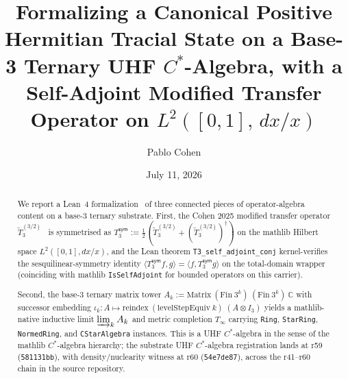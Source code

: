 \documentclass[11pt,a4paper]{amsart}
\title[Formalizing a UHF Tracial State on a Base-3 Ternary $C^*$-Algebra]{Formalizing a Canonical Positive Hermitian Tracial State on a Base-3 Ternary UHF $C^*$-Algebra, with a Self-Adjoint Modified Transfer Operator on $L^2([0,1],\, dx/x)$}
\author{Pablo Cohen}
\date{July 11, 2026}
\theoremstyle{plain}
\theoremstyle{definition}
\begin{document}
\maketitle

\begin{abstract}
\noindent We report a Lean~4 formalization~\cite{moura-ullrich2021,mathlib2020} of three connected pieces of operator-algebra content on a base-3 ternary substrate. First, the Cohen 2025 modified transfer operator $\widetilde{T}_3^{(3/2)}$~\cite{cohen2025transferOp} is symmetrised as $T_3^{\textsf{sym}} := \tfrac{1}{2}(\widetilde{T}_3^{(3/2)} + (\widetilde{T}_3^{(3/2)})^\dagger)$ on the mathlib Hilbert space $L^2([0,1], dx/x)$, and the Lean theorem \texttt{T3\_self\_adjoint\_conj} kernel-verifies the sesquilinear-symmetry identity $\langle T_3^{\textsf{sym}} f, g \rangle = \langle f, T_3^{\textsf{sym}} g \rangle$ on the total-domain wrapper (coinciding with mathlib \texttt{IsSelfAdjoint} for bounded operators on this carrier).

\smallskip

\noindent Second, the base-3 ternary matrix tower $A_k := \mathrm{Matrix}~(\mathrm{Fin}~3^k)~(\mathrm{Fin}~3^k)~\mathbb{C}$ with successor embedding $\iota_k \colon A \mapsto \mathrm{reindex}~(\mathrm{levelStepEquiv}~k)~(A \otimes I_3)$ yields a mathlib-native inductive limit $\varinjlim_k A_k$ and metric completion $T_\infty$ carrying \texttt{Ring}, \texttt{StarRing}, \texttt{NormedRing}, and \texttt{CStarAlgebra} instances. This is a UHF $C^*$-algebra in the sense of the mathlib $C^*$-algebra hierarchy; the substrate UHF $C^*$-algebra registration lands at r59 (\texttt{581131bb}), with density/nuclearity witness at r60 (\texttt{54e7de87}), across the r41--r60 chain in the source repository.

\smallskip


\end{abstract}
\end{document}
